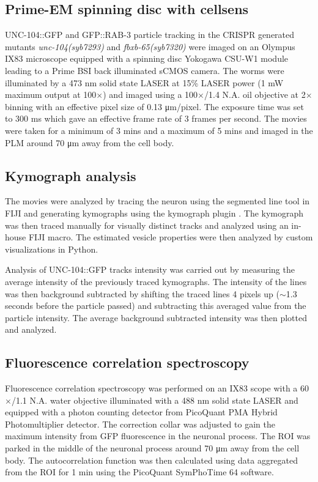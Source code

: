 \subsection{Prime-EM spinning disc with cellsens}

UNC-104::GFP and GFP::RAB-3 particle tracking in the CRISPR generated mutants \textit{unc-104(syb7293)} and \textit{fbxb-65(syb7320)} were imaged on an Olympus IX83 microscope equipped with a spinning disc Yokogawa CSU-W1 module leading to a Prime BSI back illuminated sCMOS camera. The worms were illuminated by a 473 nm solid state LASER at 15\% LASER power (1 mW maximum output at 100$\times$) and imaged using a 100$\times$/1.4 N.A. oil objective at 2$\times$ binning with an effective pixel size of 0.13 μm/pixel. The exposure time was set to 300 ms which gave an effective frame rate of 3 frames per second. The movies were taken for a minimum of 3 mins and a maximum of 5 mins and imaged in the PLM around 70 μm away from the cell body. 

\subsection{Kymograph analysis}

The movies were analyzed by tracing the neuron using the segmented line tool in FIJI and generating kymographs using the kymograph plugin \parencite{katrukha2020}. The kymograph was then traced manually for visually distinct tracks and analyzed using an in-house FIJI macro. The estimated vesicle properties were then analyzed by custom visualizations in Python.

Analysis of UNC-104::GFP tracks intensity was carried out by measuring the average intensity of the previously traced kymographs. The intensity of the lines was then background subtracted by shifting the traced lines 4 pixels up ($\sim$1.3 seconds before the particle passed) and subtracting this averaged value from the particle intensity. The average background subtracted intensity was then plotted and analyzed.

\subsection{Fluorescence correlation spectroscopy}
Fluorescence correlation spectroscopy was performed on an IX83 scope with a 60$\times$/1.1 N.A. water objective illuminated with a 488 nm solid state LASER and equipped with a photon counting detector from PicoQuant PMA Hybrid Photomultiplier detector. The correction collar was adjusted to gain the maximum intensity from GFP fluorescence in the neuronal process. The ROI was parked in the middle of the neuronal process around 70 μm away from the cell body. The autocorrelation function was then calculated using data aggregated from the ROI for 1 min using the PicoQuant SymPhoTime 64 software.

